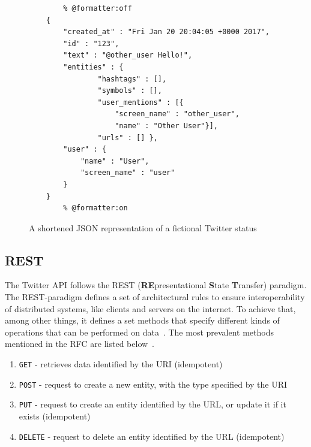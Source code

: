 
\begin{figure}
    \caption{A shortened JSON representation of a fictional Twitter status}
    \label{code:json}
    \begin{verbatim}
        % @formatter:off
    {
        "created_at" : "Fri Jan 20 20:04:05 +0000 2017",
        "id" : "123",
        "text" : "@other_user Hello!",
        "entities" : {
                "hashtags" : [],
                "symbols" : [],
                "user_mentions" : [{
                    "screen_name" : "other_user",
                    "name" : "Other User"}],
                "urls" : [] },
        "user" : {
            "name" : "User",
            "screen_name" : "user"
        }
    }
        % @formatter:on
    \end{verbatim}
\end{figure}

\subsection{REST}
\label{subsec:rest}

The Twitter API follows the REST (\textbf{RE}presentational \textbf{S}tate \textbf{T}ransfer) paradigm.
The REST-paradigm defines a set of architectural rules to ensure interoperability of distributed systems,
like clients and servers on the internet.
To achieve that, among other things,
it defines a set methods that specify different kinds of operations that can be performed on data~\cite{Jakl2008}.
The most prevalent methods mentioned in the RFC are listed below~\cite{RFC2616}.

\begin{enumerate}
    \item
    \texttt{GET} - retrieves data identified by the URI (idempotent)
    \item
    \texttt{POST} - request to create a new entity, with the type specified by the URI
    \item
    \texttt{PUT} - request to create an entity identified by the URL, or update it if it exists (idempotent)
    \item
    \texttt{DELETE} - request to delete an entity identified by the URL (idempotent)
\end{enumerate}

